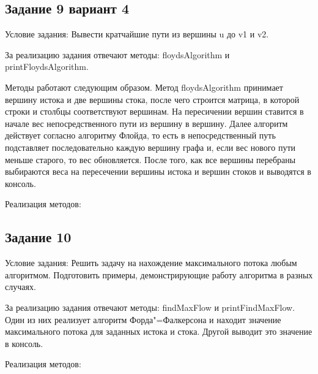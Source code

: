 \documentclass[bachelor, och, pract]{SCWorks}
\begin{document}
\subsection{Задание 9 вариант 4}

Условие задания: Вывести кратчайшие пути из вершины u до v1 и v2.
\bigskip

За реализацию задания отвечают методы: floydsAlgorithm и printFloydsAlgorithm.
\bigskip

Методы работают следующим образом. Метод floydsAlgorithm принимает вершину 
истока и две вершины стока, после чего строится матрица, в которой строки и
столбцы соответствуют вершинам. На пересичении вершин ставится в начале
вес непосредственного пути из вершину в вершину. Далее алгоритм действует
согласно алгоритму Флойда, то есть в непосредственный путь подставляет
последовательно каждую вершину графа и, если вес нового пути меньше старого,
то вес обновляется. После того, как все вершины перебраны выбираются веса
на пересечении вершины истока и вершин стоков и выводятся в консоль.
\bigskip

Реализация методов:
\bigskip


\bigskip

\subsection{Задание 10}

Условие задания: Решить задачу на нахождение максимального потока любым алгоритмом. Подготовить примеры, демонстрирующие работу алгоритма в разных случаях.
\bigskip

За реализацию задания отвечают методы: findMaxFlow и printFindMaxFlow.
Один из них реализует алгоритм Форда"=Фалкерсона и находит значение
максимального потока для заданных истока и стока. Другой выводит
это значение в консоль.
\bigskip

Реализация методов:
\bigskip


\bigskip


%

%
%
%


\appendix
\end{document}
